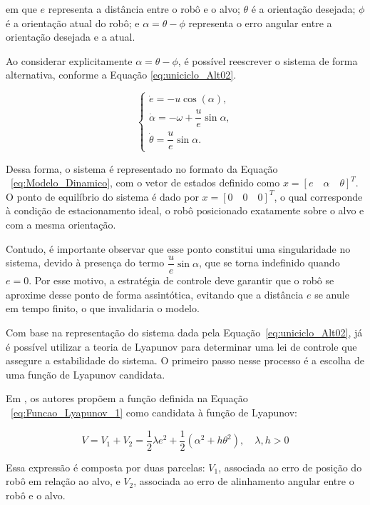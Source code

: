 \documentclass[conference]{IEEEtran}
\begin{document}
em que $e$ representa a distância entre o robô e o alvo; $\theta$ é a orientação desejada; $\phi$ é a orientação atual do robô; e $\alpha = \theta - \phi$ representa o erro angular entre a orientação desejada e a atual.

Ao considerar explicitamente $\alpha = \theta - \phi$, é possível reescrever o sistema de forma alternativa, conforme a Equação \ref{eq:uniciclo_Alt02}.

\begin{equation}
    \begin{cases}
        \dot{e} = -u \cos(\alpha), \\
        \dot{\alpha} = -\omega + \dfrac{u}{e} \sin \alpha, \\
        \dot{\theta} = \dfrac{u}{e} \sin \alpha.
    \end{cases}
    \label{eq:uniciclo_Alt02}
\end{equation}

Dessa forma, o sistema é representado no formato da Equação ~\ref{eq:Modelo_Dinamico}, com o vetor de estados definido como $x = [e \quad \alpha \quad \theta]^T$. O ponto de equilíbrio do sistema é dado por $x = [0 \quad 0 \quad 0]^T$, o qual corresponde à condição de estacionamento ideal, o robô posicionado exatamente sobre o alvo e com a mesma orientação.

Contudo, é importante observar que esse ponto constitui uma singularidade no sistema, devido à presença do termo $\dfrac{u}{e} \sin \alpha$, que se torna indefinido quando $e = 0$. Por esse motivo, a estratégia de controle deve garantir que o robô se aproxime desse ponto de forma assintótica, evitando que a distância $e$ se anule em tempo finito, o que invalidaria o modelo.

Com base na representação do sistema dada pela Equação~\ref{eq:uniciclo_Alt02}, já é possível utilizar a teoria de Lyapunov para determinar uma lei de controle que assegure a estabilidade do sistema. O primeiro passo nesse processo é a escolha de uma função de Lyapunov candidata.

Em \cite{b1}, os autores propõem a função definida na Equação ~\ref{eq:Funcao_Lyapunov_1} como candidata à função de Lyapunov:

\begin{equation}
    V = V_1 + V_2 = \frac{1}{2}\lambda e^2 + \frac{1}{2}\left( \alpha^2 + h\theta^2\right), \quad \lambda, h > 0
    \label{eq:Funcao_Lyapunov_1}
\end{equation}

Essa expressão é composta por duas parcelas: $V_1$, associada ao erro de posição do robô em relação ao alvo, e $V_2$, associada ao erro de alinhamento angular entre o robô e o alvo.
\end{document}
